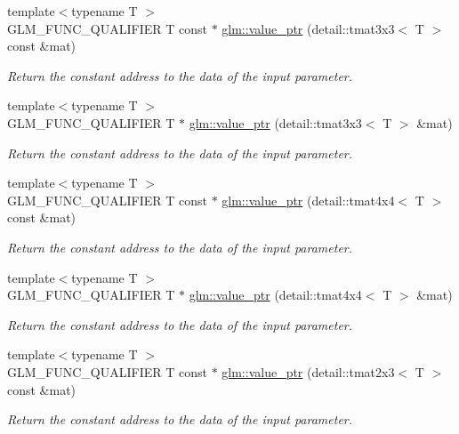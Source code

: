 \begin{DoxyCompactItemize}
{\footnotesize template$<$typename T $>$ }\\G\-L\-M\-\_\-\-F\-U\-N\-C\-\_\-\-Q\-U\-A\-L\-I\-F\-I\-E\-R T const $\ast$ \hyperlink{group__gtc__type__ptr_ga23b2a53a00923f747637fc271f78e9db}{glm\-::value\-\_\-ptr} (detail\-::tmat3x3$<$ T $>$ const \&mat)
\begin{DoxyCompactList}\small\item\em Return the constant address to the data of the input parameter. \end{DoxyCompactList}\item 
{\footnotesize template$<$typename T $>$ }\\G\-L\-M\-\_\-\-F\-U\-N\-C\-\_\-\-Q\-U\-A\-L\-I\-F\-I\-E\-R T $\ast$ \hyperlink{group__gtc__type__ptr_ga2cadd2b9a774d77c66e8f723b729c4e7}{glm\-::value\-\_\-ptr} (detail\-::tmat3x3$<$ T $>$ \&mat)
\begin{DoxyCompactList}\small\item\em Return the constant address to the data of the input parameter. \end{DoxyCompactList}\item 
{\footnotesize template$<$typename T $>$ }\\G\-L\-M\-\_\-\-F\-U\-N\-C\-\_\-\-Q\-U\-A\-L\-I\-F\-I\-E\-R T const $\ast$ \hyperlink{group__gtc__type__ptr_ga1e7076c8387f3e7436a00453a1f5fe5e}{glm\-::value\-\_\-ptr} (detail\-::tmat4x4$<$ T $>$ const \&mat)
\begin{DoxyCompactList}\small\item\em Return the constant address to the data of the input parameter. \end{DoxyCompactList}\item 
{\footnotesize template$<$typename T $>$ }\\G\-L\-M\-\_\-\-F\-U\-N\-C\-\_\-\-Q\-U\-A\-L\-I\-F\-I\-E\-R T $\ast$ \hyperlink{group__gtc__type__ptr_gadc0d39ee1a6b84a4337840746649cca3}{glm\-::value\-\_\-ptr} (detail\-::tmat4x4$<$ T $>$ \&mat)
\begin{DoxyCompactList}\small\item\em Return the constant address to the data of the input parameter. \end{DoxyCompactList}\item 
{\footnotesize template$<$typename T $>$ }\\G\-L\-M\-\_\-\-F\-U\-N\-C\-\_\-\-Q\-U\-A\-L\-I\-F\-I\-E\-R T const $\ast$ \hyperlink{group__gtc__type__ptr_ga7a07a13118bdceeaef82e330f8f47fcf}{glm\-::value\-\_\-ptr} (detail\-::tmat2x3$<$ T $>$ const \&mat)
\begin{DoxyCompactList}\small\item\em Return the constant address to the data of the input parameter. \end{DoxyCompactList}\item 

\end{DoxyCompactItemize}
